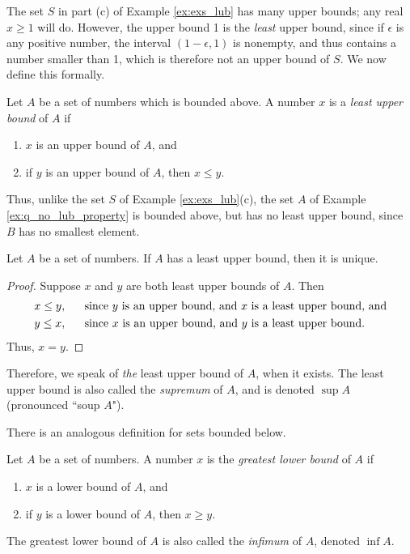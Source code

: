 \documentclass[12pt,letterpaper,reqno]{article}
\numberwithin{equation}{section}
\begin{document}
{The set $S$ in part (c) of Example \ref{ex:exs_lub} has many upper bounds; any real $x\geq 1$ will do. However, the upper bound 1 is the \emph{least} upper bound, since if $\epsilon$ is any positive number, the interval $(1-\epsilon,1)$ is nonempty, and thus contains a number smaller than 1, which is therefore not an upper bound of $S$. We now define this formally.

\begin{defn}\label{def:lub}
	Let $A$ be a set of numbers which is bounded above. A number $x$ is a \emph{least upper bound} of $A$ if
	\begin{enumerate}[(1)]
		\item $x$ is an upper bound of $A$, and
		\item if $y$ is an upper bound of $A$, then $x \leq y$.
	\end{enumerate}
\end{defn}
Thus, unlike the set $S$ of Example \ref{ex:exs_lub}(c), the set $A$ of Example \ref{ex:q_no_lub_property} is bounded above, but has no least upper bound, since $B$ has no smallest element.

\begin{prop}
Let $A$ be a set of numbers. If $A$ has a least upper bound, then it is unique.	
\end{prop}

\begin{proof}
	Suppose $x$ and $y$ are both least upper bounds of $A$. Then
	\begin{align*}
		x \leq y, & \hspace{0.5cm} \text{ since $y$ is an upper bound, and $x$ is a least upper bound, and} \\
		y \leq x, & \hspace{0.5cm} \text{ since $x$ is an upper bound, and $y$ is a least upper bound}. 
	\end{align*}
	Thus, $x=y$.
\end{proof}
Therefore, we speak of \emph{the} least upper bound of $A$, when it exists. The least upper bound is also called the \emph{supremum} of $A$, and is denoted $\sup A$ (pronounced ``soup $A$"). 

There is an analogous definition for sets bounded below.

\begin{defn}
	Let $A$ be a set of numbers. A number $x$ is the \emph{greatest lower bound} of $A$ if
	\begin{enumerate}[(1)]
		\item $x$ is a lower bound of $A$, and
		\item if $y$ is a lower bound of $A$, then $x \geq y$.
	\end{enumerate}
	The greatest lower bound of $A$ is also called the \emph{infimum} of $A$, denoted $\inf A$.
	\end{defn}

}
\end{document}
